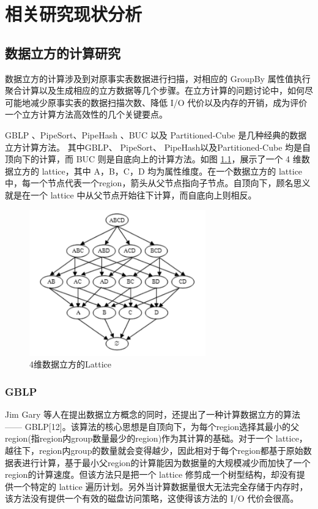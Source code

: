 \chapter{相关研究现状分析}


\section{数据立方的计算研究}

数据立方的计算涉及到对原事实表数据进行扫描，对相应的 GroupBy 属性值执行聚合计算以及生成相应的立方数据等几个步骤。在立方计算的问题讨论中，如何尽可能地减少原事实表的数据扫描次数、降低 I/O 代价以及内存的开销，成为评价一个立方计算方法高效性的几个关键要点。

GBLP \cite{gray1997data}、PipeSort、PipeHash \cite{agarwal1996computation}、BUC \cite{beyer1999bottom} 以及 Partitioned-Cube \cite{ross1997fast} 是几种经典的数据立方计算方法。 其中GBLP、 PipeSort、 PipeHash以及Partitioned-Cube 均是自顶向下的计算，而 BUC 则是自底向上的计算方法。如图 \ref{4_dimension_lattice}，展示了一个 4 维数据立方的 lattice，其中 A，B，C，D 均为属性维度。在一个数据立方的 lattice 中，每一个节点代表一个region，箭头从父节点指向子节点。自顶向下，顾名思义就是在一个 lattice 中从父节点开始往下计算，而自底向上则相反。

\begin{figure}[!htb]
\centering\includegraphics[width=3in]{picture/ch_current_research/4_dimension_lattice} 
\caption{4维数据立方的Lattice}\label{4_dimension_lattice} 
\end{figure} 

\subsection{GBLP}

Jim Gary 等人在提出数据立方概念的同时，还提出了一种计算数据立方的算法 —— GBLP[12]。该算法的核心思想是自顶向下，为每个region选择其最小的父region(指region内group数量最少的region)作为其计算的基础。对于一个 lattice，越往下，region内group的数量就会变得越少，因此相对于每个region都基于原始数据表进行计算，基于最小父region的计算能因为数据量的大规模减少而加快了一个region的计算速度。但该方法只是把一个 lattice 修剪成一个树型结构，却没有提供一个特定的 lattice 遍历计划。另外当计算数据量很大无法完全存储于内存时，该方法没有提供一个有效的磁盘访问策略，这使得该方法的 I/O 代价会很高。

